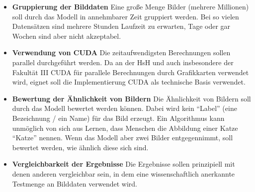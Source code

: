 \begin{itemize}
	\item \textbf{Gruppierung der Bilddaten} Eine große Menge Bilder (mehrere Millionen) soll durch das Modell in annehmbarer Zeit gruppiert werden. Bei so vielen Datensätzen sind mehrere Stunden Laufzeit zu erwarten, Tage oder gar Wochen sind aber nicht akzeptabel. 
	\item \textbf{Verwendung von CUDA} Die zeitaufwendigsten Berechnungen sollen parallel durchgeführt werden. Da an der HsH und auch insbesondere der Fakultät III CUDA für parallele Berechnungen durch Grafikkarten verwendet wird, eignet soll die Implementierung CUDA als technische Basis verwendet.
	\item \textbf{Bewertung der Ähnlichkeit von Bildern} Die Ähnlichkeit von Bildern soll durch das Modell bewertet werden können. Dabei wird kein \enquote{Label} (eine Bezeichnung / ein Name) für das Bild erzeugt. Ein Algorithmus kann unmöglich von sich aus Lernen, dass Menschen die Abbildung einer Katze \enquote{Katze} nennen. Wenn das Modell aber zwei Bilder entgegennimmt, soll bewertet werden, wie ähnlich diese sich sind.
	\item \textbf{Vergleichbarkeit der Ergebnisse} Die Ergebnisse sollen prinzipiell mit denen anderen vergleichbar sein, in dem eine wissenschaftlich anerkannte Testmenge an Bilddaten verwendet wird.
\end{itemize}
